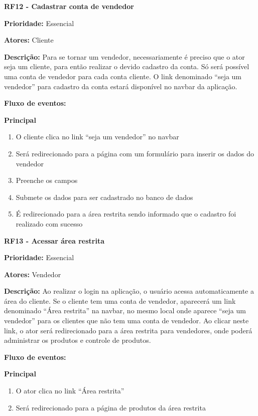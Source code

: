 \begin{apendicesenv}
\textbf{RF12 - Cadastrar conta de vendedor} \par
\textbf{Prioridade:} Essencial \par
\textbf{Atores:} Cliente \par
\textbf{Descrição:} Para se tornar um vendedor, necessariamente é preciso que o ator seja um cliente, para então realizar o devido cadastro da conta. Só será possível uma conta de vendedor para cada conta cliente. O link denominado “seja um vendedor” para cadastro da conta estará disponível no navbar da aplicação. \par
\textbf{Fluxo de eventos:} \par
\textbf{Principal} \par
\begin{enumerate}
  \item O cliente clica no link “seja um vendedor” no navbar
  \item Será redirecionado para a página com um formulário para inserir os dados do vendedor
  \item Preenche os campos
  \item Submete os dados para ser cadastrado no banco de dados
  \item É redirecionado para a área restrita sendo informado que o cadastro foi realizado com sucesso
\end{enumerate}

\textbf{RF13 - Acessar área restrita} \par
\textbf{Prioridade:} Essencial \par
\textbf{Atores:} Vendedor \par
\textbf{Descrição:} Ao realizar o login na aplicação, o usuário acessa automaticamente a área do cliente. Se o cliente tem uma conta de vendedor, aparecerá um link denominado “Área restrita” na navbar, no mesmo local onde aparece “seja um vendedor” para os  clientes que não tem uma conta de vendedor. Ao clicar neste link, o ator será redirecionado para a área restrita para vendedores, onde poderá administrar os produtos e controle de produtos. \par
\textbf{Fluxo de eventos:} \par
\textbf{Principal} \par
\begin{enumerate}
  \item O ator clica no link “Área restrita”
  \item Será redirecionado para a página de produtos da área restrita
\end{enumerate}


\end{apendicesenv}
